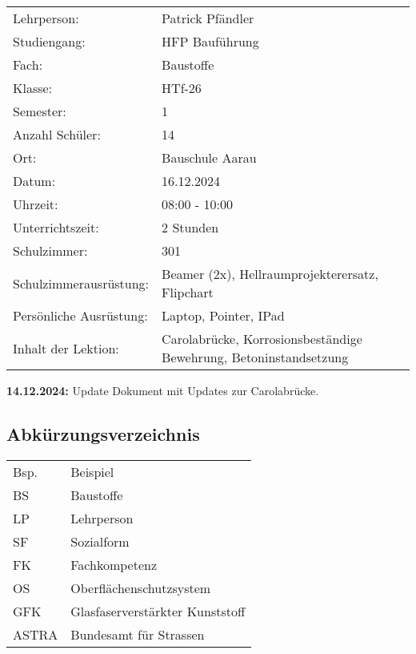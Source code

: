 \documentclass[
11pt,
captions=tableheading,
headsepline,
footsepline, 
captions=tableheading,
parskip=half-,
]{scrartcl}
\begin{document}
\begin{table}[ht]
    \centering
    \label{tab:uebersicht}
    \begin{tabularx}{\textwidth}{@{}Xp{11cm}@{}}
    \toprule
    Lehrperson: & Patrick Pfändler \\
    Studiengang: & HFP Bauführung \\
    Fach: & Baustoffe \\
    \midrule
    Klasse: & HTf-26 \\
    Semester: & 1 \\
    Anzahl Schüler: & 14 \\
    Ort: & Bauschule Aarau \\
    Datum: & 16.12.2024 \\
    Uhrzeit: & 08:00 - 10:00 \\
    Unterrichtszeit: & 2 Stunden \\
    Schulzimmer: & 301 \\
    Schulzimmerausrüstung: & Beamer (2x), Hellraumprojekterersatz, Flipchart \\
    \midrule
    Persönliche Ausrüstung: & Laptop, Pointer, IPad \\
    \midrule
    Inhalt der Lektion: & Carolabrücke, Korrosionsbeständige Bewehrung, Betoninstandsetzung \\
    \bottomrule
    \end{tabularx}
    \end{table}

    \begin{tcolorbox}[colback=blue!5!white, colframe=blue!75!black, title=CHANGELOG]
        \textbf{14.12.2024:} Update Dokument mit Updates zur Carolabrücke.
        \end{tcolorbox}


\clearpage
\vspace*{2cm}
\setcounter{tocdepth}{3} %
\tableofcontents%
\clearpage

\subsection*{Abkürzungsverzeichnis}
\begin{table}[H]
    \centering
    \label{tab:abkuerzungen}
    \begin{tabularx}{\textwidth}{@{}ll@{}}
    \toprule
    Bsp. & Beispiel \\
    BS & Baustoffe \\
    LP & Lehrperson \\
    SF & Sozialform \\
    FK & Fachkompetenz \\
    OS & Oberflächenschutzsystem \\
    GFK & Glasfaserverstärkter Kunststoff \\
    ASTRA & Bundesamt für Strassen \\
    \bottomrule
    \end{tabularx}
    \end{table}
\end{document}
